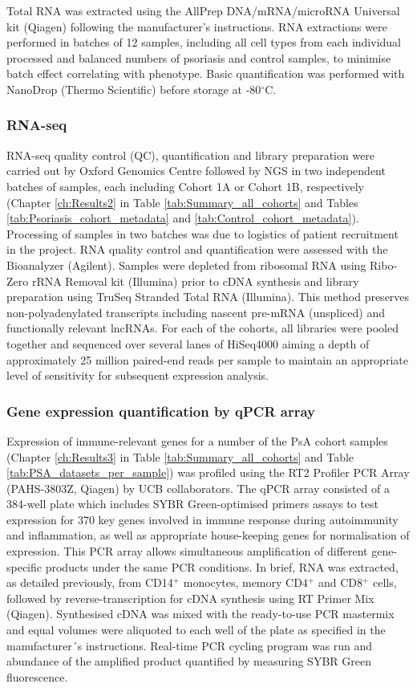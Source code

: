 Total RNA was extracted using the AllPrep DNA/mRNA/microRNA Universal kit (Qiagen) following the manufacturer's instructions. RNA extractions were performed in batches of 12 samples, including all cell types from each individual processed and balanced numbers of psoriasis and control samples, to minimise batch effect correlating with phenotype. Basic quantification was performed with NanoDrop (Thermo Scientific) before storage at -80{$^\circ$}C.

\subsubsection{RNA-seq}
RNA-seq quality control (QC), quantification and library preparation were carried out by Oxford Genomics Centre followed by NGS in two independent batches of samples, each including Cohort 1A or Cohort 1B, respectively (Chapter \ref{ch:Results2} in Table \ref{tab:Summary_all_cohorts} and Tables \ref{tab:Psoriasis_cohort_metadata} and \ref{tab:Control_cohort_metadata}). Processing of samples in two batches was due to logistics of patient recruitment in the project. RNA quality control and quantification were assessed with the Bioanalyzer (Agilent). Samples were depleted from ribosomal RNA using Ribo-Zero rRNA Removal kit (Illumina) prior to cDNA synthesis and library preparation using TruSeq Stranded Total RNA (Illumina). This method preserves non-polyadenylated transcripts including nascent pre-mRNA (unspliced) and functionally relevant lncRNAs. For each of the cohorts, all libraries were pooled together and sequenced over several lanes of HiSeq4000 aiming a depth of approximately 25 million paired-end reads per sample to maintain an appropriate level of sensitivity for subsequent expression analysis.

\subsubsection{Gene expression quantification by qPCR array}
Expression of immune-relevant genes for a number of the PsA cohort samples (Chapter \ref{ch:Results3} in Table \ref{tab:Summary_all_cohorts} and Table \ref{tab:PSA_datasets_per_sample}) was profiled using the RT2 Profiler PCR Array (PAHS-3803Z, Qiagen) by UCB collaborators. The qPCR array consisted of a 384-well plate which includes SYBR Green-optimised primers assays to test expression for 370 key genes involved in immune response during autoimmunity and inflammation, as well as appropriate house-keeping genes for normalisation of expression. This PCR array allows simultaneous amplification of different gene-specific products under the same PCR conditions. In brief, RNA was extracted, as detailed previously, from CD14$^+$ monocytes, memory CD4$^+$ and CD8$^+$ cells, followed by reverse-transcription for cDNA synthesis using RT Primer Mix (Qiagen). Synthesised cDNA was mixed with the ready-to-use PCR mastermix and equal volumes were aliquoted to each well of the plate as specified in the manufacturer´s instructions. Real-time PCR cycling program was run and abundance of the amplified product quantified by measuring SYBR Green fluorescence. 



